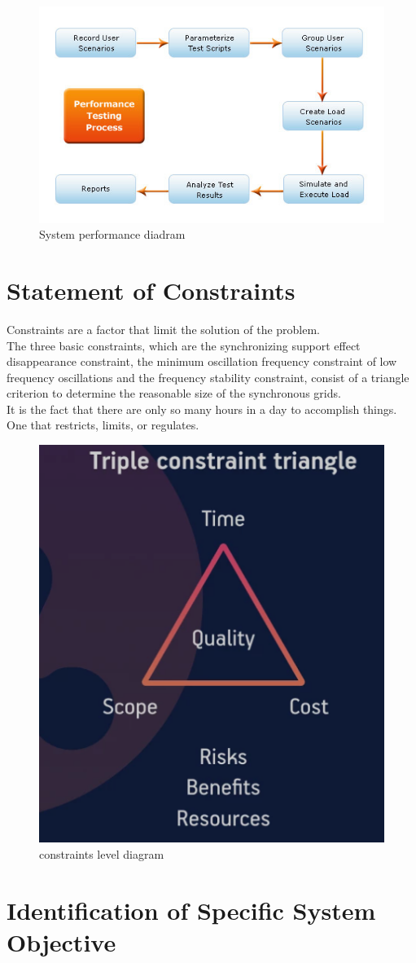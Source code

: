 \documentclass[a4paper,12pt]{book}
\begin{document}
\begin{figure}[h]
	\centering
	\includegraphics[width=0.7\linewidth]{Performance-Testing-Process}
	\caption{System performance diadram}
	\label{fig:performance-testing-process}
\end{figure}
\section{Statement of Constraints}
	Constraints are a factor that limit the solution of the problem.\\
	The three basic constraints, which are the synchronizing support effect disappearance constraint, the minimum oscillation frequency constraint of low frequency oscillations and the frequency stability constraint, consist of a triangle criterion to determine the reasonable size of the synchronous grids.\\
	It is the fact that there are only so many hours in a day to accomplish things. One that restricts, limits, or regulates.\\	
\begin{figure}[h]
	\centering
	\includegraphics[width=0.6\linewidth]{7_1}
	\caption{constraints level diagram}
	\label{fig:71}
\end{figure}
\section{Identification of Specific System Objective}
\end{document}
